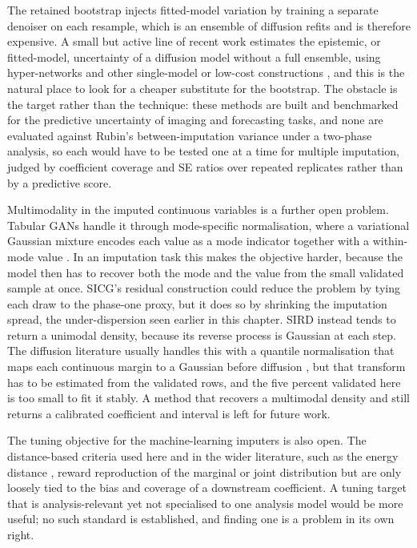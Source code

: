 The retained bootstrap injects fitted-model variation by training a separate denoiser on each resample, which is an ensemble of diffusion refits and is therefore expensive. A small but active line of recent work estimates the epistemic, or fitted-model, uncertainty of a diffusion model without a full ensemble, using hyper-networks and other single-model or low-cost constructions \citep{chan2024estimating,berry2024shedding,ekmekci2023quantifying,jazbec2025generative,gupta2026quantifying}, and this is the natural place to look for a cheaper substitute for the bootstrap. The obstacle is the target rather than the technique: these methods are built and benchmarked for the predictive uncertainty of imaging and forecasting tasks, and none are evaluated against Rubin's between-imputation variance under a two-phase analysis, so each would have to be tested one at a time for multiple imputation, judged by coefficient coverage and SE ratios over repeated replicates rather than by a predictive score.

Multimodality in the imputed continuous variables is a further open problem. Tabular GANs handle it through mode-specific normalisation, where a variational Gaussian mixture encodes each value as a mode indicator together with a within-mode value \citep{xu2019modeling,zhao2022ctabganplus}. In an imputation task this makes the objective harder, because the model then has to recover both the mode and the value from the small validated sample at once. SICG's residual construction could reduce the problem by tying each draw to the phase-one proxy, but it does so by shrinking the imputation spread, the under-dispersion seen earlier in this chapter. SIRD instead tends to return a unimodal density, because its reverse process is Gaussian at each step. The diffusion literature usually handles this with a quantile normalisation that maps each continuous margin to a Gaussian before diffusion \citep{kotelnikov2023tabddpm}, but that transform has to be estimated from the validated rows, and the five percent validated here is too small to fit it stably. A method that recovers a multimodal density and still returns a calibrated coefficient and interval is left for future work.

The tuning objective for the machine-learning imputers is also open. The distance-based criteria used here and in the wider literature, such as the energy distance \citep{szekely2003statistics,naf2025mar}, reward reproduction of the marginal or joint distribution but are only loosely tied to the bias and coverage of a downstream coefficient. A tuning target that is analysis-relevant yet not specialised to one analysis model would be more useful; no such standard is established, and finding one is a problem in its own right.

